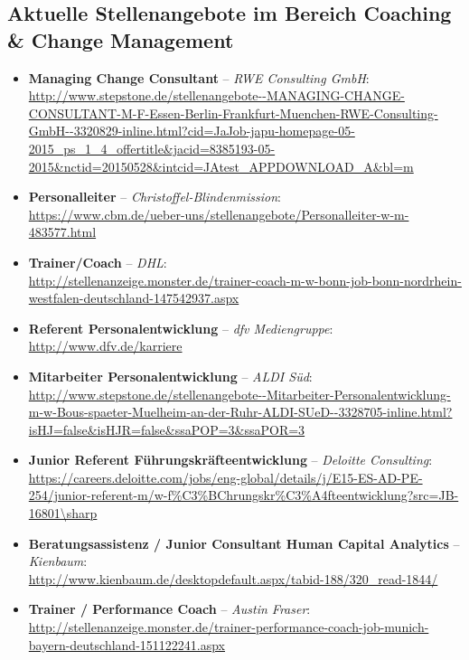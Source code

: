 \documentclass[11pt,a4paper]{article}
\begin{document}
\subsection*{\textsf{Aktuelle Stellenangebote im Bereich Coaching \& Change Management}}


\begin{itemize}

\item \textbf{Managing Change Consultant} -- \textsl{RWE Consulting GmbH}:\\ \textsf{\textcolor{MidnightBlue}{\url{http://www.stepstone.de/stellenangebote--MANAGING-CHANGE-CONSULTANT-M-F-Essen-Berlin-Frankfurt-Muenchen-RWE-Consulting-GmbH--3320829-inline.html?cid=JaJob-japu-homepage-05-2015_ps_1_4_offertitle&jacid=8385193-05-2015&nctid=20150528&intcid=JAtest_APPDOWNLOAD_A&bl=m}}}

\item \textbf{Personalleiter} -- \textsl{Christoffel-Blindenmission}:\\
\textsf{\textcolor{MidnightBlue}{\url{https://www.cbm.de/ueber-uns/stellenangebote/Personalleiter-w-m-483577.html}}}

\item \textbf{Trainer/Coach} -- \textsl{DHL}:\\
\textsf{\textcolor{MidnightBlue}{\url{http://stellenanzeige.monster.de/trainer-coach-m-w-bonn-job-bonn-nordrhein-westfalen-deutschland-147542937.aspx}}}

\item \textbf{Referent Personalentwicklung} -- \textsl{dfv Mediengruppe}:\\
\textsf{\textcolor{MidnightBlue}{\url{http://www.dfv.de/karriere}}}

\item \textbf{Mitarbeiter Personalentwicklung} -- \textsl{ALDI Süd}:\\
\textsf{\textcolor{MidnightBlue}{\url{http://www.stepstone.de/stellenangebote--Mitarbeiter-Personalentwicklung-m-w-Bous-spaeter-Muelheim-an-der-Ruhr-ALDI-SUeD--3328705-inline.html?isHJ=false\&isHJR=false&ssaPOP=3\&ssaPOR=3}}}

\item \textbf{Junior Referent Führungskräfteentwicklung} -- \textsl{Deloitte Consulting}:\\
\textsf{\textcolor{MidnightBlue}{\url{https://careers.deloitte.com/jobs/eng-global/details/j/E15-ES-AD-PE-254/junior-referent-m/w-f\%C3\%BChrungskr\%C3\%A4fteentwicklung?src=JB-16801\sharp}}}

\item \textbf{Beratungsassistenz / Junior Consultant Human Capital Analytics} -- \textsl{Kienbaum}:\\
\textsf{\textcolor{MidnightBlue}{\url{http://www.kienbaum.de/desktopdefault.aspx/tabid-188/320_read-1844/}}}

\item \textbf{Trainer / Performance Coach} -- \textsl{Austin Fraser}:\\
\textsf{\textcolor{MidnightBlue}{\url{http://stellenanzeige.monster.de/trainer-performance-coach-job-munich-bayern-deutschland-151122241.aspx}}}

\end{itemize}
\end{document}
